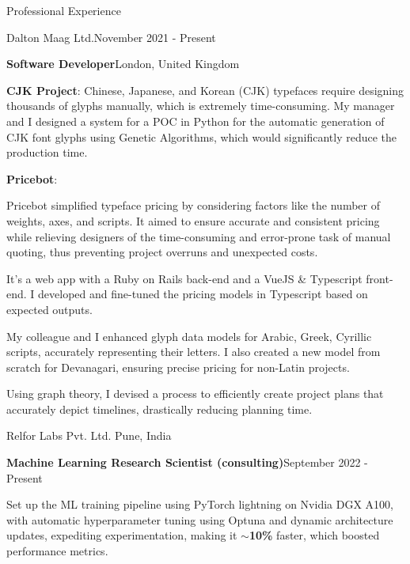 \documentclass{resume} %
\begin{document}
\smallskip
\smallskip
\begin{rSection}{Professional Experience}

\begin{rSubsection}{Dalton Maag Ltd.}{November 2021 - Present}{}{}
\begin{rSubsubsection}{\textbf{Software Developer}}{London, United Kingdom}{}
\item \textbf{CJK Project}: Chinese, Japanese, and Korean (CJK) typefaces require designing thousands of glyphs manually, which is extremely time-consuming. My manager and I designed a system for a POC in Python for the automatic generation of CJK font glyphs using Genetic Algorithms, which would significantly reduce the production time.
\item \textbf{Pricebot}:
\item Pricebot simplified typeface pricing by considering factors like the number of weights, axes, and scripts. It aimed to ensure accurate and consistent pricing while relieving designers of the time-consuming and error-prone task of manual quoting, thus preventing project overruns and unexpected costs.
\item It's a web app with a Ruby on Rails back-end and a VueJS \& Typescript front-end. I developed and fine-tuned the pricing models in Typescript based on expected outputs.
\item My colleague and I enhanced glyph data models for Arabic, Greek, Cyrillic scripts, accurately representing their letters. I also created a new model from scratch for Devanagari, ensuring precise pricing for non-Latin projects.
\item Using graph theory, I devised a process to efficiently create project plans that accurately depict timelines, drastically reducing planning time.
\end{rSubsubsection}
\vspace{-0.4em}
\end{rSubsection}
\vspace{-0.4em}
\hdashrule[1pt]{19cm}{0.5pt}{1mm 1mm}
\begin{rSubsection}{Relfor Labs Pvt. Ltd.}
{Pune, India}{}{}
\begin{rSubsubsection}{\textbf{Machine Learning Research Scientist (consulting)}}{September 2022 - Present}{}
    \item Set up the ML training pipeline using PyTorch lightning on Nvidia DGX A100, with automatic hyperparameter tuning using Optuna and dynamic architecture updates, expediting experimentation, making it \textbf{$\sim$10\%} faster, which boosted performance metrics.

\end{rSubsubsection}
\end{rSubsection}
\end{rSection}
\end{document}
